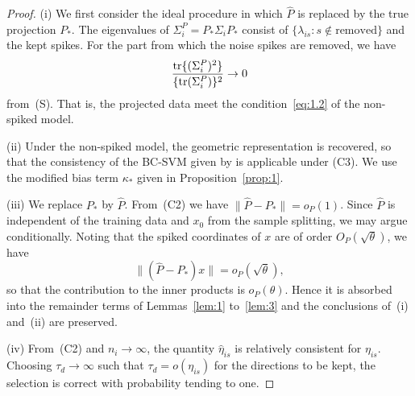 \begin{proof}
(i) We first consider the ideal procedure in which $\hat P$ is replaced by the true
projection $P_*$. The eigenvalues of $\Sigma_i^P=P_*\Sigma_i P_*$ consist of
$\{\lambda_{is}:s\notin\text{removed}\}$ and the kept spikes. For the part from
which the noise spikes are removed, we have
\[
\frac{\operatorname{tr}\{(\Sigma_i^P)^2\}}{\{\operatorname{tr}(\Sigma_i^P)\}^2}\to 0
\]
from~(S). That is, the projected data meet the condition~\eqref{eq:1.2} of the
non-spiked model.

(ii) Under the non-spiked model, the geometric representation is recovered, so that
the consistency of the BC-SVM given by \citet{nakayama2017} is applicable under
(C3). We use the modified bias term $\kappa_*$ given in Proposition~\ref{prop:1}.

(iii) We replace $P_*$ by $\hat P$. From~(C2) we have $\|\hat P-P_*\|=o_P(1)$.
Since $\hat P$ is independent of the training data and $x_0$ from the sample
splitting, we may argue conditionally. Noting that the spiked coordinates of $x$
are of order $O_P(\sqrt{\theta})$, we have
\[
\|(\hat P-P_*)x\|=o_P(\sqrt{\theta}),
\]
so that the contribution to the inner products is $o_P(\theta)$. Hence it is
absorbed into the remainder terms of Lemmas~\ref{lem:1} to~\ref{lem:3} and the
conclusions of~(i) and~(ii) are preserved.

(iv) From~(C2) and $n_i\to\infty$, the quantity $\hat\eta_{is}$ is relatively
consistent for $\eta_{is}$. Choosing $\tau_d\to\infty$ such that
$\tau_d=o(\eta_{is})$ for the directions to be kept, the selection is correct with
probability tending to one.
\end{proof}
